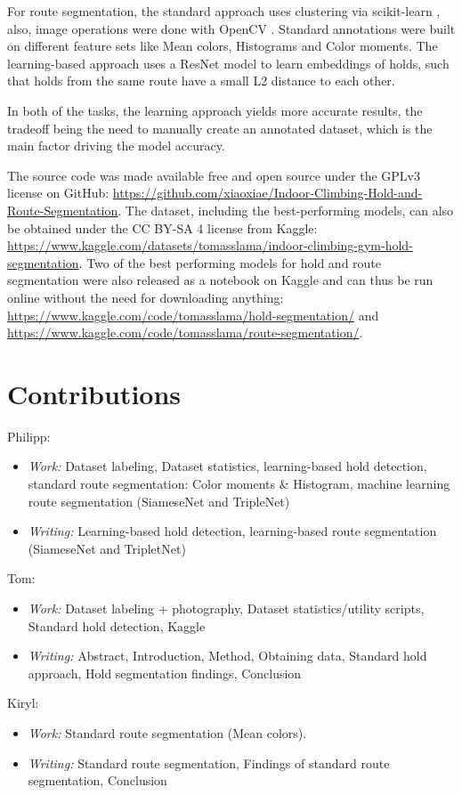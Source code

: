 \documentclass[final]{cvpr}
\begin{document}
For route segmentation, the standard approach uses clustering via scikit-learn \cite{scikit}, also, image operations were done with OpenCV \cite{opencv}. Standard annotations were built on different feature sets like Mean colors, Histograms and Color moments. The learning-based approach uses a ResNet model to learn embeddings of holds, such that holds from the same route have a small L2 distance to each other.

In both of the tasks, the learning approach yields more accurate results, the tradeoff being the need to manually create an annotated dataset, which is the main factor driving the model accuracy.

The source code was made available free and open source under the GPLv3 license on GitHub: \url{https://github.com/xiaoxiae/Indoor-Climbing-Hold-and-Route-Segmentation}.
The dataset, including the best-performing models, can also be obtained under the CC BY-SA 4 license from Kaggle: \url{https://www.kaggle.com/datasets/tomasslama/indoor-climbing-gym-hold-segmentation}.
Two of the best performing models for hold and route segmentation were also released as a notebook on Kaggle and can thus be run online without the need for downloading anything: \url{https://www.kaggle.com/code/tomasslama/hold-segmentation/} and \url{https://www.kaggle.com/code/tomasslama/route-segmentation/}.

\section{Contributions}

Philipp:
\begin{itemize}
    \setlength\itemsep{0em}
    \item \textit{Work:} Dataset labeling, Dataset statistics, learning-based hold detection, standard route segmentation: Color moments \& Histogram, machine learning route segmentation (SiameseNet and TripleNet)
    \item \textit{Writing:} Learning-based hold detection, learning-based route segmentation (SiameseNet and TripletNet)
\end{itemize}

Tom: 
\begin{itemize}
    \setlength\itemsep{0em}
    \item \textit{Work:} Dataset labeling + photography, Dataset statistics/utility scripts, Standard hold detection, Kaggle
    \item \textit{Writing:} Abstract, Introduction, Method, Obtaining data, Standard hold approach, Hold segmentation findings, Conclusion
\end{itemize}

Kiryl:
\begin{itemize}
    \setlength\itemsep{0em}
    \item \textit{Work:} Standard route segmentation (Mean colors).
    \item \textit{Writing:} Standard route segmentation, Findings of standard route segmentation, Conclusion
\end{itemize}

{\small


}
\end{document}
